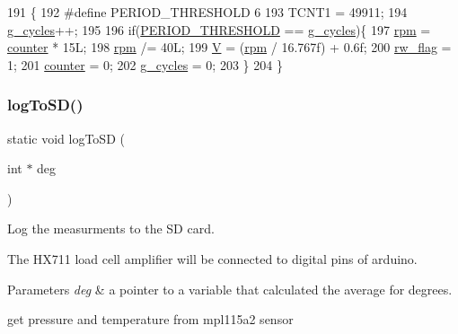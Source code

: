 \begin{DoxyCode}
191 \{
192 \textcolor{preprocessor}{#define PERIOD\_THRESHOLD 6 }
193 \textcolor{preprocessor}{    TCNT1 = 49911;}
194     \mbox{\hyperlink{windsensor_8ino_a04af5fae2fee3e96724c5a2d4cdba9ea}{g\_cycles}}++;
195     
196     \textcolor{keywordflow}{if}(\mbox{\hyperlink{windsensor_8ino_a4b6027f22a7f9e0128f472f0526ce23d}{PERIOD\_THRESHOLD}} == \mbox{\hyperlink{windsensor_8ino_a04af5fae2fee3e96724c5a2d4cdba9ea}{g\_cycles}})\{
197         \mbox{\hyperlink{windsensor_8ino_a1571ae0d208fed39e6690affb377db08}{rpm}}     = \mbox{\hyperlink{windsensor_8ino_a3d4f497af9a194d9e03e5d9a9b0ee67d}{counter}} * 15L;
198         \mbox{\hyperlink{windsensor_8ino_a1571ae0d208fed39e6690affb377db08}{rpm}}    /= 40L;
199         \mbox{\hyperlink{windsensor_8ino_aa4fd0d57d98c7d4f1072f2edd19ab2ed}{V}}       = (\mbox{\hyperlink{windsensor_8ino_a1571ae0d208fed39e6690affb377db08}{rpm}} / 16.767f) + 0.6f;
200         \mbox{\hyperlink{windsensor_8ino_a2ff89ca4ee93f613d9003947a163355b}{rw\_flag}} = 1;
201         \mbox{\hyperlink{windsensor_8ino_a3d4f497af9a194d9e03e5d9a9b0ee67d}{counter}} = 0;
202         \mbox{\hyperlink{windsensor_8ino_a04af5fae2fee3e96724c5a2d4cdba9ea}{g\_cycles}} = 0;
203     \}
204 \}
\end{DoxyCode}
\mbox{\label{windsensor_8ino_a6125069fcf9a9e592937a7b143c4ce7a}} 
\subsubsection{\texorpdfstring{log\+To\+S\+D()}{logToSD()}}
{\footnotesize\ttfamily static void log\+To\+SD (\begin{DoxyParamCaption}\item[{int $\ast$}]{deg }\end{DoxyParamCaption})\hspace{0.3cm}{\ttfamily [static]}}



Log the measurments to the SD card. 

The H\+X711 load cell amplifier will be connected to digital pins of arduino. 
\begin{DoxyParams}{Parameters}
{\em deg} & a pointer to a variable that calculated the average for degrees. \\
\hline
\end{DoxyParams}
get pressure and temperature from mpl115a2 sensor


